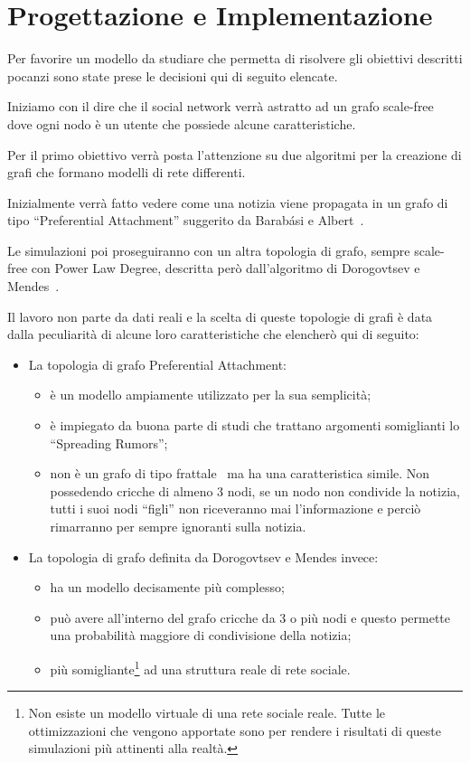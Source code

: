 \section{Progettazione e Implementazione}
\label{section:progettazione}


Per favorire un modello da studiare che permetta di risolvere gli obiettivi descritti 
pocanzi sono state prese le decisioni qui di seguito elencate.

Iniziamo con il dire che il social network verrà astratto ad un grafo scale-free dove ogni 
nodo è un utente che possiede alcune caratteristiche.

Per il primo obiettivo verrà posta l'attenzione su due algoritmi per la creazione di grafi che 
formano modelli di rete differenti.

Inizialmente verrà fatto vedere come una notizia viene propagata in un grafo di tipo 
``Preferential Attachment'' suggerito da Barabási e Albert~\cite{biblio:barabasilab_emergence}.

Le simulazioni poi proseguiranno con un altra topologia di grafo, sempre scale-free 
con Power Law Degree, descritta però dall'algoritmo di Dorogovtsev e Mendes~\cite{biblio:evolution_networks}.

Il lavoro non parte da dati reali e la scelta di queste topologie di grafi è data 
dalla peculiarità di alcune loro caratteristiche che elencherò qui di seguito:
\begin{itemize}
 \item La topologia di grafo Preferential Attachment:
 \begin{itemize}
  \item è un modello ampiamente utilizzato per la sua semplicità;
  \item è impiegato da buona parte di studi che trattano argomenti somiglianti lo ``Spreading Rumors'';
  \item non è un grafo di tipo frattale~\cite{biblio:fractal_resistant_disease} ma ha una caratteristica simile. 
 Non possedendo cricche di almeno 3 nodi, se un nodo non condivide la notizia, 
 tutti i suoi nodi ``figli'' non riceveranno mai l'informazione e perciò rimarranno per sempre ignoranti sulla notizia.
 \end{itemize}
 
 \item La topologia di grafo definita da Dorogovtsev e Mendes invece:
  \begin{itemize}
  \item ha un modello decisamente più complesso;
  \item può avere all'interno del grafo cricche da 3 o più nodi e questo permette una probabilità maggiore di condivisione della notizia;
  \item più somigliante\footnote{\scriptsize Non esiste un modello virtuale di una rete sociale reale. 
  Tutte le ottimizzazioni che vengono apportate sono per rendere i risultati di queste simulazioni più attinenti alla realtà.}
  ad una struttura reale di rete sociale.
 \end{itemize}
\end{itemize}

